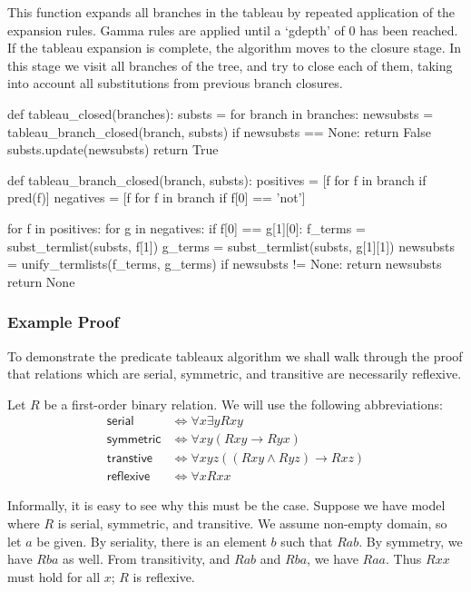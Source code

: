 \documentclass[a4paper,notitlepage]{scrartcl}
\begin{document}
This function expands all branches in the tableau by repeated application of
the expansion rules. Gamma rules are applied until a `gdepth' of 0 has been
reached. If the tableau expansion is complete, the algorithm moves to the
closure stage. In this stage we visit all branches of the tree, and try to
close each of them, taking into account all substitutions from previous branch
closures.

\begin{code}
def tableau_closed(branches):
    substs = {}
    for branch in branches:
        newsubsts = tableau_branch_closed(branch, substs)
        if newsubsts == None:
            return False
        substs.update(newsubsts)
    return True

def tableau_branch_closed(branch, substs):
    positives = [f for f in branch if pred(f)]
    negatives = [f for f in branch if f[0] == 'not']

    for f in positives:
        for g in negatives:
            if f[0] == g[1][0]:
                f_terms = subst_termlist(substs, f[1])
                g_terms = subst_termlist(substs, g[1][1])
                newsubsts = unify_termlists(f_terms, g_terms)
                if newsubsts != None:
                    return newsubsts
    return None
\end{code}

\subsubsection{Example Proof}

To demonstrate the predicate tableaux algorithm we shall walk through the
   proof that relations which are serial, symmetric, and transitive are
   necessarily reflexive.

Let $R$ be a first-order binary relation. 
We will use the following abbreviations:
\begin{align*}
\textsf{serial}& \iff \forall x\exists yRxy\\
\textsf{symmetric}& \iff \forall xy(Rxy\rightarrow Ryx)\\
\textsf{transtive}& \iff \forall xyz((Rxy\land Ryz)\rightarrow Rxz)\\
\textsf{reflexive}& \iff \forall x Rxx
\end{align*}

Informally, it is easy to see why this must be the case.
Suppose we have model where $R$ is serial, symmetric, and transitive.
We assume non-empty domain, so let $a$ be given.
By seriality, there is an element $b$ such that $Rab$.
By symmetry, we have $Rba$ as well.
From transitivity, and $Rab$ and $Rba$, we have $Raa$.
Thus $Rxx$ must hold for all $x$; $R$ is reflexive.
\end{document}
